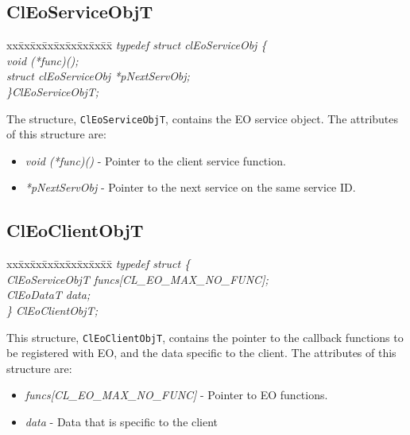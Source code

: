 \begin{flushleft}
\subsection{ClEoServiceObjT}
\begin{tabbing}
xx\=xx\=xx\=xx\=xx\=xx\=xx\=xx\=xx\=\kill
\textit{typedef struct clEoServiceObj \{}\\
\>\>\>\textit{void                    (*func)();}\\
\>\>\>\textit{struct clEoServiceObj   *pNextServObj;}\\
\textit{\}ClEoServiceObjT;}\end{tabbing}
The structure, {\tt{ClEoServiceObjT}}, contains the EO service object. The attributes of this structure are:
\begin{itemize}
 \item
 \textit{void (*func)()} - Pointer to the client service function.
 \item
 \textit{*pNextServObj} - Pointer to the next service on the same service ID.
\end{itemize}




\subsection{ClEoClientObjT}
\begin{tabbing}
xx\=xx\=xx\=xx\=xx\=xx\=xx\=xx\=xx\=\kill
\textit{typedef struct \{}\\
\>\>\>\textit{ClEoServiceObjT     funcs[CL\_EO\_MAX\_NO\_FUNC];}\\
\>\>\>\textit{ClEoDataT           data;}\\
\textit{\} ClEoClientObjT;}\end{tabbing}
This structure, {\tt{ClEoClientObjT}}, contains the pointer to the callback functions to be
registered with EO, and the data specific to the client. The attributes of this structure are:
\begin{itemize}
 \item
 \textit{funcs[CL\_\-EO\_\-MAX\_\-NO\_\-FUNC]} - Pointer to EO functions.
 \item
 \textit{data} - Data that is specific to the client
 \end{itemize}



\end{flushleft}
